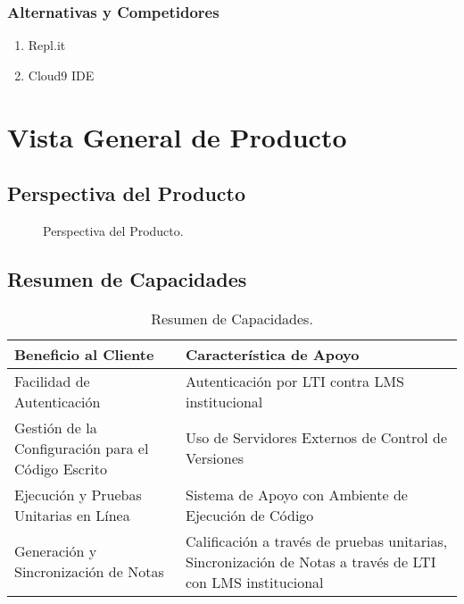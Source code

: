 \subsubsection{Alternativas y Competidores}
\begin{enumerate}
	\item Repl.it
    \item Cloud9 IDE
\end{enumerate}

\section{Vista General de Producto}
\subsection{Perspectiva del Producto}
\begin{figure}
  \begin{center}
  \end{center}
  \caption{Perspectiva del Producto.}
  \label{pers-prod}
\end{figure}

\pagebreak

\subsection{Resumen de Capacidades}
\begin{table}[h!]
  \begin{tabular}{|p{}|p{}|}
    \hline
    \textbf{Beneficio al Cliente} & \textbf{Característica de Apoyo} \\
    \hline
    Facilidad de Autenticación & Autenticación por LTI contra LMS institucional \\
    \hline
    Gestión de la Configuración para el Código Escrito & Uso de Servidores Externos de Control de Versiones \\
    \hline
    Ejecución y Pruebas Unitarias en Línea & Sistema de Apoyo con Ambiente de Ejecución de Código \\
    \hline
    Generación y Sincronización de Notas & Calificación a través de pruebas unitarias, Sincronización de Notas a través de LTI con LMS institucional \\
    \hline
  \end{tabular}
  \caption{Resumen de Capacidades.}
  \label{res-cap}
\end{table}

